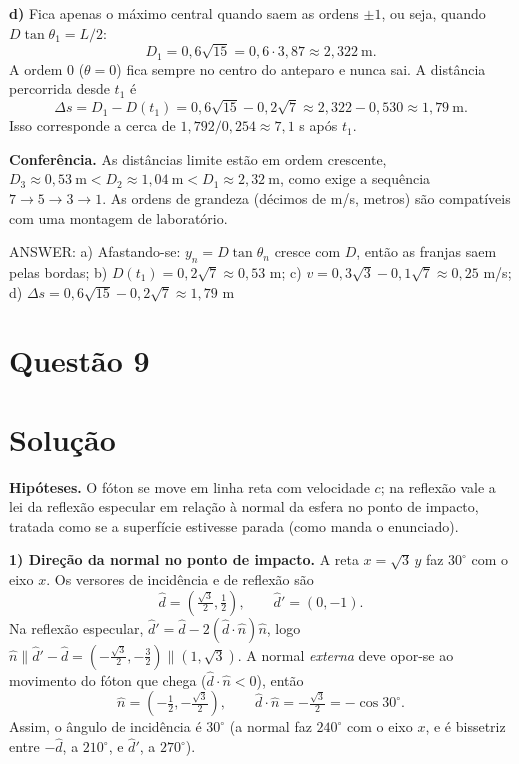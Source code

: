 \documentclass{article}%
\begin{document}
\textbf{d)} Fica apenas o máximo central quando saem as ordens $\pm1$, ou seja, quando $D\tan\theta_1=L/2$:
\[
D_1=0{,}6\sqrt{15}=0{,}6\cdot3{,}87\approx 2{,}322\ \text{m}.
\]
A ordem $0$ ($\theta=0$) fica sempre no centro do anteparo e nunca sai. A distância percorrida desde $t_1$ é
\[
\Delta s=D_1-D(t_1)=0{,}6\sqrt{15}-0{,}2\sqrt7\approx 2{,}322-0{,}530\approx 1{,}79\ \text{m}.
\]
Isso corresponde a cerca de $1{,}792/0{,}254\approx 7{,}1$ s após $t_1$.

\textbf{Conferência.} As distâncias limite estão em ordem crescente, $D_3\approx0{,}53\ \text{m}<D_2\approx1{,}04\ \text{m}<D_1\approx2{,}32\ \text{m}$, como exige a sequência $7\to5\to3\to1$. As ordens de grandeza (décimos de m/s, metros) são compatíveis com uma montagem de laboratório.

ANSWER: a) Afastando-se: $y_n=D\tan\theta_n$ cresce com $D$, então as franjas saem pelas bordas; b) $D(t_1)=0{,}2\sqrt7\approx0{,}53$ m; c) $v=0{,}3\sqrt3-0{,}1\sqrt7\approx0{,}25$ m/s; d) $\Delta s=0{,}6\sqrt{15}-0{,}2\sqrt7\approx1{,}79$ m%
\newpage%
\section*{Questão 9}

\section*{Solução}

\textbf{Hipóteses.} O fóton se move em linha reta com velocidade $c$; na reflexão vale a lei da reflexão especular em relação à normal da esfera no ponto de impacto, tratada como se a superfície estivesse parada (como manda o enunciado).

\textbf{1) Direção da normal no ponto de impacto.} A reta $x=\sqrt{3}\,y$ faz $30^\circ$ com o eixo $x$. Os versores de incidência e de reflexão são
\[
\hat d=\left(\tfrac{\sqrt3}{2},\tfrac12\right),\qquad \hat d'=(0,-1).
\]
Na reflexão especular, $\hat d'=\hat d-2(\hat d\cdot\hat n)\hat n$, logo $\hat n\parallel \hat d'-\hat d=\left(-\tfrac{\sqrt3}{2},-\tfrac32\right)\parallel(1,\sqrt3)$. A normal \emph{externa} deve opor-se ao movimento do fóton que chega ($\hat d\cdot\hat n<0$), então
\[
\hat n=\left(-\tfrac12,-\tfrac{\sqrt3}{2}\right),\qquad \hat d\cdot\hat n=-\tfrac{\sqrt3}{2}=-\cos 30^\circ .
\]
Assim, o ângulo de incidência é $30^\circ$ (a normal faz $240^\circ$ com o eixo $x$, e é bissetriz entre $-\hat d$, a $210^\circ$, e $\hat d'$, a $270^\circ$).
\end{document}
